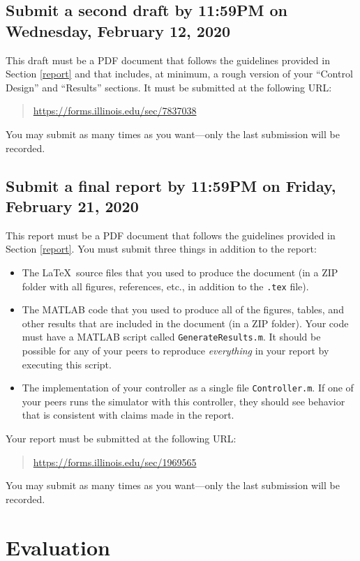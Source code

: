 \documentclass[conf]{new-aiaa}
\begin{document}
\subsection{Submit a second draft by 11:59PM on Wednesday, February 12, 2020}

This draft must be a PDF document that follows the guidelines provided in Section \ref{report} and that includes, at minimum, a rough version of your ``Control Design'' and ``Results'' sections. It must be submitted at the following URL:
\begin{quote}
\url{https://forms.illinois.edu/sec/7837038}
\end{quote}
You may submit as many times as you want---only the last submission will be recorded.

\subsection{Submit a final report by 11:59PM on Friday, February 21, 2020}

This report must be a PDF document that follows the guidelines provided in Section \ref{report}. You must submit three things in addition to the report:
\begin{itemize}
\item The \LaTeX\ source files that you used to produce the document (in a ZIP folder with all figures, references, etc., in addition to the \lstinline|.tex| file).
\item The MATLAB code that you used to produce all of the figures, tables, and other results that are included in the document (in a ZIP folder). Your code must have a MATLAB script called \lstinline|GenerateResults.m|. It should be possible for any of your peers to reproduce {\em everything} in your report by executing this script.
\item The implementation of your controller as a single file \lstinline|Controller.m|. If one of your peers runs the simulator with this controller, they should see behavior that is consistent with claims made in the report.
\end{itemize}
Your report must be submitted at the following URL:
\begin{quote}
\url{https://forms.illinois.edu/sec/1969565}
\end{quote}
You may submit as many times as you want---only the last submission will be recorded.


\section{Evaluation}
\end{document}
